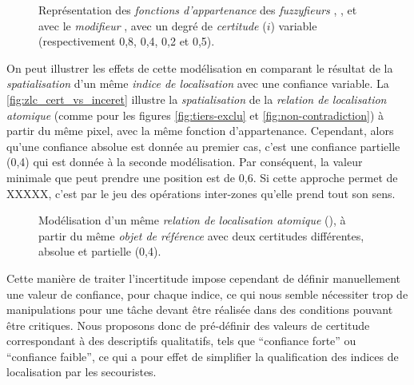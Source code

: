 \begin{figure}
  \centering  \subfloat[\label{fig:fnc_app_inc}]{}\hfill
  \subfloat[\label{fig:fnc_app_inc_2}]{}

  \subfloat[\label{fig:fnc_app_inc_3}]{}\hfill
  \subfloat[\label{fig:fnc_app_inc_4}]{}
  \caption[Représentation des \emph{fonctions d'appartenance} de
  différents \emph{fuzzyfieurs} avec une
  \emph{incertitude}]{Représentation des \emph{fonctions
      d'appartenance} des \emph{fuzzyfieurs}
    \protect{} \protect{},
    \protect{} \protect{},
    \protect{} \protect{}
    et \protect{} avec le \emph{modifieur}
    \protect{} \protect{}, avec
    un degré de \emph{certitude} (\(i\)) variable (respectivement
    0,8, 0,4, 0,2 et 0,5).}
  \label{fig:fnc_incert}
\end{figure}

On peut illustrer les effets de cette modélisation en comparant le
résultat de la \emph{spatialisation} d'un même \emph{indice de
  localisation} avec une confiance variable. La
\autoref{fig:zlc_cert_vs_inceret} illustre la \emph{spatialisation} de
la \emph{relation de localisation atomique} 
(comme pour les figures \ref{fig:tiers-exclu} et
\ref{fig:non-contradiction}) à partir du même pixel, avec la même
fonction d'appartenance. Cependant, alors qu'une confiance absolue est
donnée au premier cas, c'est une confiance partielle (0,4) qui est
donnée à la seconde modélisation. Par conséquent, la valeur minimale
que peut prendre une position est de 0,6. Si cette approche permet de
XXXXX, c'est par le jeu des opérations inter-zones qu'elle prend tout
son sens.

\begin{figure}
  \centering
  \subfloat[]{}\hspace{2cm}
  \subfloat[]{}
  \caption{Modélisation d'un même \emph{relation de localisation
      atomique} (\protect{}), à partir du même
    \emph{objet de référence} avec deux certitudes différentes,
    absolue et partielle (0,4).}
  \label{fig:zlc_cert_vs_inceret}
\end{figure}

Cette manière de traiter l'incertitude impose cependant de définir
manuellement une valeur de confiance, pour chaque indice, ce qui nous
semble nécessiter trop de manipulations pour une tâche devant être
réalisée dans des conditions pouvant être critiques. Nous proposons
donc de pré-définir des valeurs de certitude correspondant à des
descriptifs qualitatifs, tels que \enquote{confiance forte} ou
\enquote{confiance faible}, ce qui a pour effet de simplifier la
qualification des indices de localisation par les secouristes.

